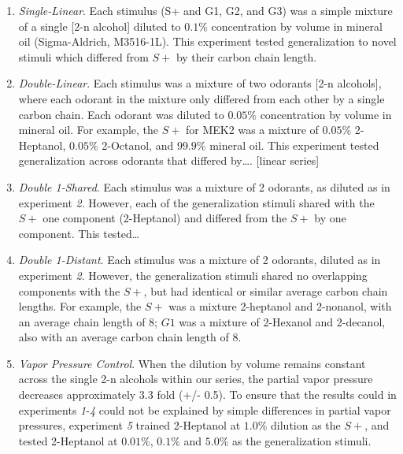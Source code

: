 \begin{enumerate}
\item \textit{Single-Linear}. Each stimulus (S+ and G1, G2, and G3) was a simple mixture of a single [2-n alcohol] diluted to $0.1\%$ concentration by volume in mineral oil (Sigma-Aldrich, M3516-1L). This experiment tested generalization to novel stimuli which differed from $S+$ by their carbon chain length.

\item \textit{Double-Linear}. Each stimulus was a mixture of two odorants [2-n alcohols], where each odorant in the mixture only differed from each other by a single carbon chain. Each odorant was diluted to $0.05\%$ concentration by volume in mineral oil. For example, the $S+$ for MEK2 was a mixture of $0.05\%$ 2-Heptanol, $0.05\%$ 2-Octanol, and $99.9\%$ mineral oil.  This experiment tested generalization across odorants that differed by…. [linear series]

\item \textit{Double 1-Shared}. Each stimulus was a mixture of 2 odorants, as diluted as in experiment \textit{2}. However, each of the generalization stimuli shared with the $S+$ one component (2-Heptanol) and differed from the $S+$ by one component. This tested…

\item \textit{Double 1-Distant}. Each stimulus was a mixture of 2 odorants, diluted as in experiment \textit{2}. However, the generalization stimuli shared no overlapping components with the $S+$, but had identical or similar average carbon chain lengths. For example, the $S+$ was a mixture 2-heptanol and 2-nonanol, with an average chain length of 8; $G1$ was a mixture of 2-Hexanol and 2-decanol, also with an average carbon chain length of 8.

\item \textit{Vapor Pressure Control}. When the dilution by volume remains constant across the single 2-n alcohols within our series, the partial vapor pressure decreases approximately 3.3 fold (+/- 0.5). To ensure that the results could in experiments \textit{1}-\textit{4} could not be explained by simple differences in partial vapor pressures, experiment \textit{5} trained 2-Heptanol at $1.0\%$ dilution as the $S+$, and tested 2-Heptanol at $0.01\%$, $0.1\%$ and $5.0\%$ as the generalization stimuli.
\end{enumerate}
